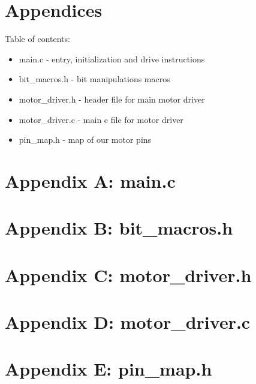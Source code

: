 \documentclass[letterpaper,11pt]{texMemo} %
\begin{document}
\newpage
\section*{Appendices}
Table of contents:
\begin{itemize}
    \item main.c - entry, initialization and drive instructions
    \item bit\_macros.h - bit manipulations macros
    \item motor\_driver.h - header file for main motor driver
    \item motor\_driver.c - main c file for motor driver
    \item pin\_map.h - map of our motor pins
\end{itemize}
\newpage

\section*{Appendix A: main.c}
\begin{tiny}

\end{tiny}
\newpage

\section*{Appendix B: bit\_macros.h}
\begin{tiny}

\end{tiny}
\newpage

\section*{Appendix C: motor\_driver.h}
\begin{tiny}

\end{tiny}
\newpage

\section*{Appendix D: motor\_driver.c}
\begin{tiny}

\end{tiny}
\newpage

\section*{Appendix E: pin\_map.h}
\begin{tiny}

\end{tiny}
\newpage
\end{document}
